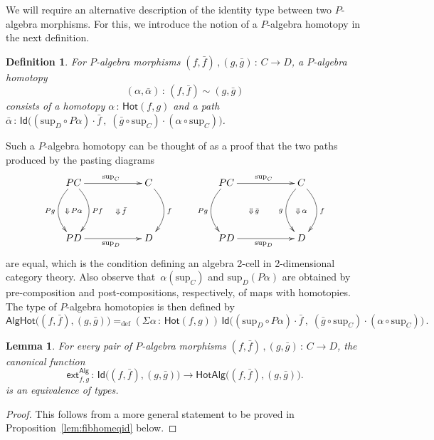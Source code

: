 \documentclass[10pt,a4paper,oneside,reqno]{amsart}
\numberwithin{equation}{section}
\theoremstyle{mythm}
\newtheorem{lemma}[theorem]{Lemma}
\theoremstyle{mydef}
\newtheorem{definition}[theorem]{Definition}
\theoremstyle{myrmk}
\newcommand{\defeq}{=_{\mathrm{def}}}
\newcommand{\co}{\,{:}\,}
\newcommand{\ct}{\cdot}
\newcommand{\Hot}{\mathsf{Hot}}
\newcommand{\ext}{\mathsf{ext}}
\newcommand{\Id}{\mathsf{Id}}
\newcommand{\Palg}{\mathsf{Alg}}
\renewcommand{\sup}{\mathrm{sup}}
\newcommand{\AlgHot}{\mathsf{AlgHot}}
\begin{document}
\medskip

We will require an alternative description of the identity type between two $P$-algebra morphisms. For this, we introduce 
the notion of a $P$-algebra homotopy in the next definition.


\begin{definition}
For $P$-algebra morphisms $(f, \bar{f}) \, , (g, \bar{g}) \co C \to D$, a \emph{$P$-algebra homotopy}  
\[
(\alpha, \bar{\alpha}) \co (f, \bar{f}) \sim (g, \bar{g})
\] 
consists of a homotopy $\alpha \co\Hot( f , g)$ and a path
$\bar{\alpha} \co \Id\big(  ( \sup_D \circ P \alpha ) \ct  \bar{f} \, , \;  (\bar{g} \circ \sup_C) \cdot (\alpha \circ \sup_C)\big)$. 
\end{definition}

Such a $P$-algebra homotopy can be thought of as a proof that the two paths produced by the pasting diagrams
\[
\xymatrix@C=2cm@R=1.5cm{
PC \ar[r]^{\sup_C} \ar@/_1.3pc/[d]_{Pg}  \ar@/^1.3pc/[d]^{Pf}  \ar@{}[dr]|{\qquad \Downarrow \, \bar{f}}
\ar@{}[d]|{\Downarrow \, P\alpha}
  & C \ar@/^1.3pc/[d]^{f} \\ 
PD \ar[r]_{\sup_D} & D} \qquad
\xymatrix@C=2cm@R=1.5cm{
PC \ar[r]^{\sup_C} \ar@/_1.3pc/[d]_{Pg}  \ar@{}[dr]|{\Downarrow \, \bar{g} \qquad} & C \ar@/^1.3pc/[d]^{f} \ar@/_1.3pc/[d]_{g} \ar@{}[d]|{\Downarrow \, \alpha} \\ 
PD \ar[r]_{\sup_D} & D} 
\]
are equal, which is the condition defining an algebra 2-cell in 2-dimensional category theory.  Also observe that~$\alpha(\sup_C)$ and $\sup_D(P \alpha)$ are obtained by pre-composition and post-compositions, respectively, of maps with homotopies.  The type of $P$-algebra homotopies is then defined by
\[
\AlgHot \big( (f,\bar{f}), (g, \bar{g})  \big)
 \defeq  
(\Sigma \alpha \co \Hot(  f , g)) \, \Id\big( 
( \sup_D \circ P \alpha ) \ct  \bar{f} \, , \;  (\bar{g} \circ \sup_C) \cdot (\alpha \circ \sup_C)
 \big) \, .
\]


\newcommand{\HotAlg}{\mathsf{HotAlg}}


\begin{lemma}\label{IdEqHo}
For every pair of $P$-algebra morphisms $(f, \bar{f}) \, , (g, \bar{g}) \co C \to D$,  
the canonical function
\[
\ext^{\Palg}_{f,g}  \co 
\Id\big((f, \bar{f}), (g, \bar{g})\big) \to \HotAlg \big((f, \bar{f}), (g, \bar{g})\big).
\]
 is an equivalence of types. 
\end{lemma}

\begin{proof}
This follows from a more general statement to be proved in Proposition~\ref{lem:fibhomeqid} below.
\end{proof}
\end{document}
